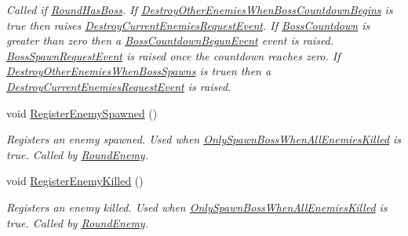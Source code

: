 \begin{DoxyCompactItemize}
\begin{DoxyCompactList}\small\item\em Called if \hyperlink{class_round_manager_1_1_round_a3e8205a74f196546906314f802f41127}{Round\+Has\+Boss}. If \hyperlink{class_round_manager_1_1_round_acf766221ab1b301a493e1702acb5ef6a}{Destroy\+Other\+Enemies\+When\+Boss\+Countdown\+Begins} is true then raises \hyperlink{class_round_manager_1_1_events_1_1_destroy_current_enemies_request_event}{Destroy\+Current\+Enemies\+Request\+Event}. If \hyperlink{class_round_manager_1_1_round_a468cf0f58dd938b9c1f327f55313e71a}{Boss\+Countdown} is greater than zero then a \hyperlink{class_round_manager_1_1_events_1_1_boss_countdown_begun_event}{Boss\+Countdown\+Begun\+Event} event is raised. \hyperlink{class_round_manager_1_1_events_1_1_boss_spawn_request_event}{Boss\+Spawn\+Request\+Event} is raised once the countdown reaches zero. If \hyperlink{class_round_manager_1_1_round_a3efd4fcc0924c9b469d2cc96f1f418cd}{Destroy\+Other\+Enemies\+When\+Boss\+Spawns} is truen then a \hyperlink{class_round_manager_1_1_events_1_1_destroy_current_enemies_request_event}{Destroy\+Current\+Enemies\+Request\+Event} is raised. \end{DoxyCompactList}\item 
void \hyperlink{class_round_manager_1_1_round_a5c1ac17afb8c4391a2852a1f520a471a}{Register\+Enemy\+Spawned} ()
\begin{DoxyCompactList}\small\item\em Registers an enemy spawned. Used when \hyperlink{class_round_manager_1_1_round_ac82296cb0b990188a4a1426cb07c1bb7}{Only\+Spawn\+Boss\+When\+All\+Enemies\+Killed} is true. Called by \hyperlink{class_round_manager_1_1_round_enemy}{Round\+Enemy}. \end{DoxyCompactList}\item 
void \hyperlink{class_round_manager_1_1_round_a84d7654a4dd50ab4c9da2c14b746cfd8}{Register\+Enemy\+Killed} ()
\begin{DoxyCompactList}\small\item\em Registers an enemy killed. Used when \hyperlink{class_round_manager_1_1_round_ac82296cb0b990188a4a1426cb07c1bb7}{Only\+Spawn\+Boss\+When\+All\+Enemies\+Killed} is true. Called by \hyperlink{class_round_manager_1_1_round_enemy}{Round\+Enemy}. \end{DoxyCompactList}\end{DoxyCompactItemize}
